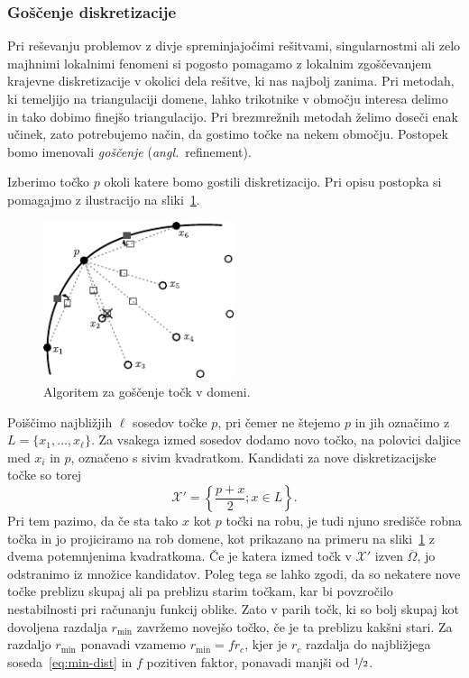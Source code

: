 \documentclass[12pt,a4paper,twoside]{article}
\theoremstyle{definition} %
\theoremstyle{plain} %
\numberwithin{equation}{section}
\newcommand{\X}{\mathcal{X}}
\newcommand{\zomega}{\overline{\Omega}}
\newcommand{\ang}[1]{(\hspace{-1.5px}\textit{angl.}\ #1)}
\begin{document}
\subsubsection{Goščenje diskretizacije}
\label{sec:goscenje}
Pri reševanju problemov z divje spreminjajočimi rešitvami, singularnostmi ali zelo majhnimi
lokalnimi fenomeni si pogosto pomagamo z lokalnim zgoščevanjem krajevne diskretizacije v okolici
dela rešitve, ki nas najbolj zanima. Pri metodah, ki temeljijo na triangulaciji domene, lahko
trikotnike v območju interesa delimo in tako dobimo finejšo triangulacijo. Pri brezmrežnih
metodah želimo doseči enak učinek, zato potrebujemo način, da gostimo točke na nekem območju.
Postopek bomo imenovali \emph{goščenje} \ang{refinement}.

Izberimo točko $p$ okoli katere bomo gostili diskretizacijo. Pri opisu postopka si pomagajmo z
ilustracijo na sliki~\ref{fig:refine-algorithm}.
\begin{figure}[h]
  \centering
  \includegraphics[width=0.5\textwidth]{images/domain_refine.pdf}
  \caption{Algoritem za goščenje točk v domeni.}
  \label{fig:refine-algorithm}
\end{figure}
Poiščimo najbližjih $\ell$ sosedov točke $p$, pri čemer ne štejemo $p$ in jih označimo z $L = \{x_1,
\dots, x_\ell\}$. Za vsakega izmed sosedov dodamo novo točko, na polovici daljice med $x_i$ in $p$,
označeno s sivim kvadratkom. Kandidati za nove diskretizacijske točke so torej
\begin{equation}
   \X' = \left\{ \frac{p+x}{2}; x \in L \right\}.
\end{equation}
Pri tem pazimo, da če sta tako $x$ kot $p$ točki na robu, je tudi njuno središče robna točka in jo
projiciramo na rob domene, kot prikazano na primeru na sliki~\ref{fig:refine-algorithm} z dvema
potemnjenima kvadratkoma. Če je katera izmed točk v $\X'$ izven $\zomega$, jo odstranimo iz množice
kandidatov. Poleg tega se lahko zgodi, da so nekatere nove točke preblizu skupaj ali pa preblizu
starim točkam, kar bi povzročilo nestabilnosti pri računanju funkcij oblike. Zato v parih točk, ki
so bolj skupaj kot dovoljena razdalja $r_{\text{min}}$ zavržemo novejšo točko, če je ta preblizu
kakšni stari. Za razdaljo $r_\text{min}$ ponavadi vzamemo $r_\text{min} = f r_c$, kjer je $r_c$
razdalja do najbližjega soseda~\eqref{eq:min-dist} in $f$ pozitiven faktor, ponavadi manjši od
$\nicefrac{1}{2}$.
\end{document}

